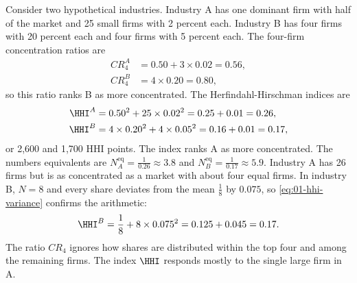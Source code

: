 \begin{example}\label{ex:01-concentration}
Consider two hypothetical industries. Industry A has one dominant firm with half of the market and 25 small
firms with 2 percent each. Industry B has four firms with 20 percent each and four firms with 5 percent each.
The four-firm concentration ratios are
\begin{align*}
  \mathit{CR}_4^A &= 0.50 + 3 \times 0.02 = 0.56, \\
  \mathit{CR}_4^B &= 4 \times 0.20 = 0.80,
\end{align*}
so this ratio ranks B as more concentrated. The Herfindahl-Hirschman indices are
\begin{align*}
  \HHI^A &= 0.50^2 + 25 \times 0.02^2 = 0.25 + 0.01 = 0.26, \\
  \HHI^B &= 4 \times 0.20^2 + 4 \times 0.05^2 = 0.16 + 0.01 = 0.17,
\end{align*}
or 2,600 and 1,700 HHI points. The index ranks A as more concentrated. The numbers equivalents are
$N^{\mathrm{eq}}_A = \frac{1}{0.26} \approx 3.8$ and $N^{\mathrm{eq}}_B = \frac{1}{0.17} \approx 5.9$. Industry A has 26 firms but is
as concentrated as a market with about four equal firms. In industry B, $N = 8$ and every share deviates from
the mean $\frac{1}{8}$ by $0.075$, so \eqref{eq:01-hhi-variance} confirms the arithmetic:
\[
  \HHI^B = \frac{1}{8} + 8 \times 0.075^2 = 0.125 + 0.045 = 0.17 .
\]
The ratio $\mathit{CR}_4$ ignores how shares are distributed within the top four and among the remaining firms.
The index $\HHI$ responds mostly to the single large firm in A.
\end{example}

